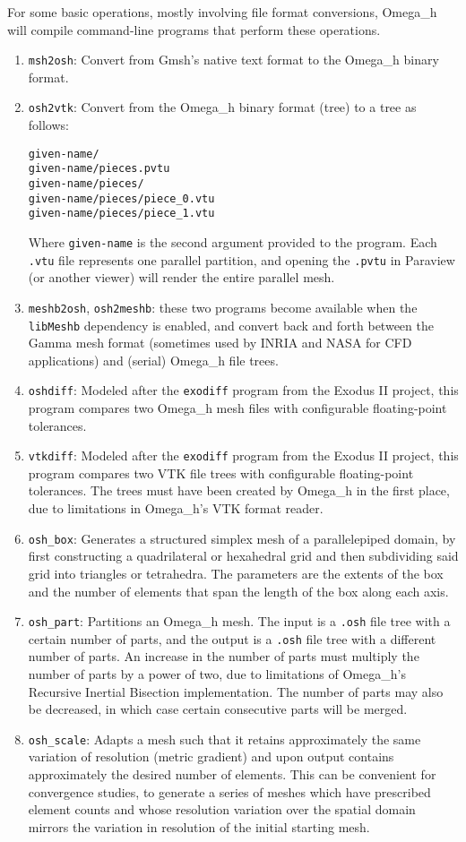 \documentclass{article}
\begin{document}
For some basic operations, mostly involving file format conversions,
Omega\_h will compile command-line programs that perform these operations.

\begin{enumerate}
\item \texttt{msh2osh}: Convert from Gmsh's native text format to the Omega\_h binary format.
\item \texttt{osh2vtk}: Convert from the Omega\_h binary format (tree) to a tree as follows:
\begin{verbatim}
given-name/
given-name/pieces.pvtu
given-name/pieces/
given-name/pieces/piece_0.vtu
given-name/pieces/piece_1.vtu
\end{verbatim}
Where \texttt{given-name} is the second argument provided to the program.
Each \texttt{.vtu} file represents one parallel partition, and opening the \texttt{.pvtu}
in Paraview (or another viewer) will render the entire parallel mesh.
\item \texttt{meshb2osh}, \texttt{osh2meshb}: these two programs become available
when the \texttt{libMeshb} dependency is enabled, and convert back and forth
between the Gamma mesh format (sometimes used by INRIA and NASA for CFD applications)
and (serial) Omega\_h file trees.
\item \texttt{oshdiff}: Modeled after the \texttt{exodiff} program from the Exodus II
project, this program compares two Omega\_h mesh files with configurable floating-point
tolerances.
\item \texttt{vtkdiff}: Modeled after the \texttt{exodiff} program from the Exodus II
project, this program compares two VTK file trees with configurable floating-point
tolerances. The trees must have been created by Omega\_h in the first place, due
to limitations in Omega\_h's VTK format reader.
\item \texttt{osh\_box}: Generates a structured simplex mesh of a parallelepiped domain,
by first constructing a quadrilateral or hexahedral grid and then subdividing said grid
into triangles or tetrahedra.
The parameters are the extents of the box and the number of elements that span
the length of the box along each axis.
\item \texttt{osh\_part}: Partitions an Omega\_h mesh. The input is a \texttt{.osh} file
tree with a certain number of parts, and the output is a \texttt{.osh} file tree with
a different number of parts.
An increase in the number of parts must multiply the number of parts by a power of two,
due to limitations of Omega\_h's Recursive Inertial Bisection implementation.
The number of parts may also be decreased, in which case certain consecutive parts will
be merged.
\item \texttt{osh\_scale}: Adapts a mesh such that it retains approximately the
same variation of resolution (metric gradient) and upon output contains approximately
the desired number of elements.
This can be convenient for convergence studies, to generate a series of meshes which
have prescribed element counts and whose resolution variation over the spatial domain
mirrors the variation in resolution of the initial starting mesh.
\end{enumerate}
\end{document}
